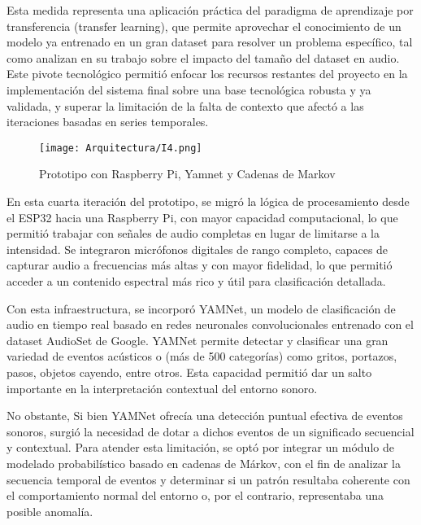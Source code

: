 Esta medida representa una aplicación práctica del paradigma de aprendizaje por transferencia (transfer learning), que permite aprovechar el conocimiento de un modelo ya entrenado en un gran dataset para resolver un problema específico, tal como analizan \citeauthor{pons2019deep} \citeyear{pons2019deep} en su trabajo sobre el impacto del tamaño del dataset en audio. Este pivote tecnológico permitió enfocar los recursos restantes del proyecto en la implementación del sistema final sobre una base tecnológica robusta y ya validada, y superar la limitación de la falta de contexto que afectó a las iteraciones basadas en series temporales.


      \begin{figure}[ht!]
            \centering
            \texttt{[image: Arquitectura/I4.png]}
            \caption{Prototipo con Raspberry Pi, Yamnet y Cadenas de Markov}
            \label{fig:prototipo4}
      \end{figure}

      En esta cuarta iteración del prototipo, se migró la lógica de procesamiento desde el ESP32 hacia una Raspberry Pi, con mayor capacidad computacional, lo que permitió trabajar con señales de audio completas en lugar de limitarse a la intensidad. Se integraron micrófonos digitales de rango completo, capaces de capturar audio a frecuencias más altas y con mayor fidelidad, lo que permitió acceder a un contenido espectral más rico y útil para clasificación detallada.

      Con esta infraestructura, se incorporó YAMNet, un modelo de clasificación de audio en tiempo real basado en redes neuronales convolucionales entrenado con el dataset AudioSet de Google. YAMNet permite detectar y clasificar una gran variedad de eventos acústicos o (más de 500 categorías) como gritos, portazos, pasos, objetos cayendo, entre otros. Esta capacidad permitió dar un salto importante en la interpretación contextual del entorno sonoro.

      No obstante, Si bien YAMNet ofrecía una detección puntual efectiva de eventos sonoros, surgió la necesidad de dotar a dichos eventos de un significado secuencial y contextual. Para atender esta limitación, se optó por integrar un módulo de modelado probabilístico basado en cadenas de Márkov, con el fin de analizar la secuencia temporal de eventos y determinar si un patrón resultaba coherente con el comportamiento normal del entorno o, por el contrario, representaba una posible anomalía.

